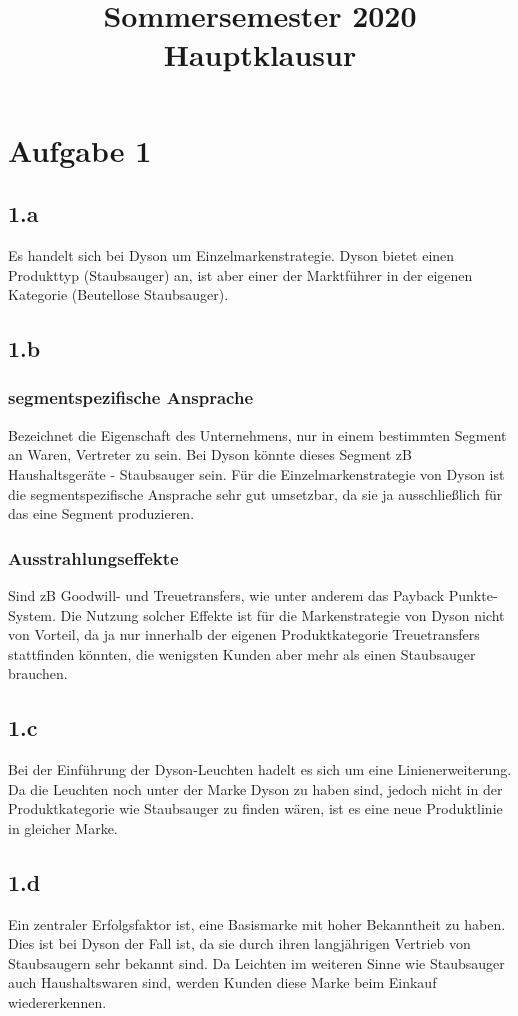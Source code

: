 \documentclass{article}
\title{Sommersemester 2020 Hauptklausur}
\begin{document}
\maketitle


\section{Aufgabe 1}
\subsection{1.a}
Es handelt sich bei Dyson um Einzelmarkenstrategie. Dyson bietet einen Produkttyp (Staubsauger) an, ist aber einer der Marktführer in der eigenen Kategorie (Beutellose Staubsauger).


\subsection{1.b}
\subsubsection{segmentspezifische Ansprache}
Bezeichnet die Eigenschaft des Unternehmens, nur in einem bestimmten Segment an Waren, Vertreter zu sein. Bei Dyson könnte dieses Segment zB Haushaltsgeräte - Staubsauger sein. Für die Einzelmarkenstrategie von Dyson ist die segmentspezifische Ansprache sehr gut umsetzbar, da sie ja ausschließlich für das eine Segment produzieren.

\subsubsection{Ausstrahlungseffekte}
Sind zB Goodwill- und Treuetransfers, wie unter anderem das Payback Punkte-System. Die Nutzung solcher Effekte ist für die Markenstrategie von Dyson nicht von Vorteil, da ja nur innerhalb der eigenen Produktkategorie Treuetransfers stattfinden könnten, die wenigsten Kunden aber mehr als einen Staubsauger brauchen.


\subsection{1.c}
Bei der Einführung der Dyson-Leuchten hadelt es sich um eine Linienerweiterung. Da die Leuchten noch unter der Marke Dyson zu haben sind, jedoch nicht in der Produktkategorie wie Staubsauger zu finden wären, ist es eine neue Produktlinie in gleicher Marke.


\subsection{1.d}
Ein zentraler Erfolgsfaktor ist, eine Basismarke mit hoher Bekanntheit zu haben. Dies ist bei Dyson der Fall ist, da sie durch ihren langjährigen Vertrieb von Staubsaugern sehr bekannt sind. Da Leichten im weiteren Sinne wie Staubsauger auch Haushaltswaren sind, werden Kunden diese Marke beim Einkauf wiedererkennen.
\end{document}
